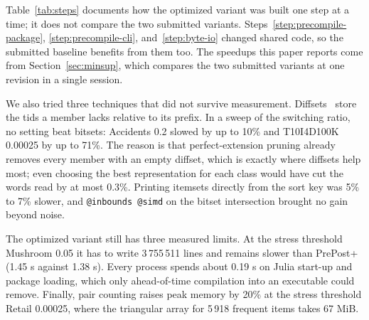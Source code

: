 Table~\ref{tab:steps} documents how the optimized variant was built one step at a time; it
does not compare the two submitted variants. Steps~\ref{step:precompile-package},
\ref{step:precompile-cli}, and~\ref{step:byte-io} changed shared code, so the submitted
baseline benefits from them too. The speedups this paper reports come from
Section~\ref{sec:minsup}, which compares the two submitted variants at one revision in a
single session.

We also tried three techniques that did not survive measurement. Diffsets~\cite{zaki2003}
store the tids a member lacks relative to its prefix. In a sweep of the switching ratio,
no setting beat bitsets: Accidents 0.2 slowed by up to 10\% and T10I4D100K 0.00025 by up
to 71\%. The reason is that perfect-extension pruning already removes every member with
an empty diffset, which is exactly where diffsets help most; even choosing the best
representation for each class would have cut the words read by at most 0.3\%. Printing
itemsets directly from the sort key was 5\% to 7\% slower, and \texttt{@inbounds @simd} on
the bitset intersection brought no gain beyond noise.

The optimized variant still has three measured limits. At the stress threshold
Mushroom 0.05 it has to write 3\,755\,511 lines and remains slower than PrePost+ (1.45 s
against 1.38 s). Every process spends about 0.19 s on Julia start-up and package loading,
which only ahead-of-time compilation into an executable could remove. Finally, pair
counting raises peak memory by 20\% at the stress threshold Retail 0.00025, where the
triangular array for 5\,918 frequent items takes 67 MiB.
